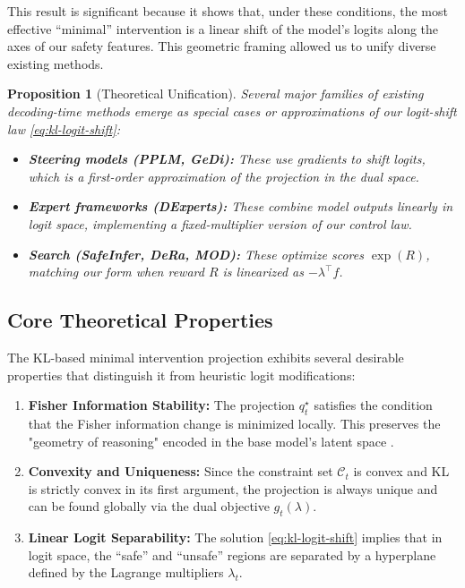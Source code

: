 \documentclass{article}
\theoremstyle{plain}
\newtheorem{proposition}[theorem]{Proposition}
\theoremstyle{definition}
\theoremstyle{remark}
\begin{document}
This result is significant because it shows that, under these conditions, the most effective ``minimal'' intervention is a linear shift of the model's logits along the axes of our safety features. This geometric framing allowed us to unify diverse existing methods.
\begin{proposition}[Theoretical Unification]
\label{prop:unified}
Several major families of existing decoding-time methods emerge as special cases or approximations of our logit-shift law \eqref{eq:kl-logit-shift}:
\begin{itemize}[leftmargin=1.5em, itemsep=0pt]
  \item \textbf{Steering models (PPLM, GeDi):} These use gradients to shift logits, which is a first-order approximation of the projection in the dual space.
  \item \textbf{Expert frameworks (DExperts):} These combine model outputs linearly in logit space, implementing a fixed-multiplier version of our control law.
  \item \textbf{Search (SafeInfer, DeRa, MOD):} These optimize scores $\exp(R)$, matching our form when reward $R$ is linearized as $-\lambda^\top f$.
\end{itemize}
\end{proposition}

\subsection{Core Theoretical Properties}
\label{sec:kl-properties}

The KL-based minimal intervention projection exhibits several desirable properties that distinguish it from heuristic logit modifications:
\begin{enumerate}[leftmargin=1.5em, itemsep=0pt]
  \item \textbf{Fisher Information Stability:} The projection $q_t^\star$ satisfies the condition that the Fisher information change is minimized locally. This preserves the "geometry of reasoning" encoded in the base model's latent space \citep{amari2016information}.
  \item \textbf{Convexity and Uniqueness:} Since the constraint set $\mathcal{C}_t$ is convex and KL is strictly convex in its first argument, the projection is always unique and can be found globally via the dual objective $g_t(\lambda)$.
  \item \textbf{Linear Logit Separability:} The solution \eqref{eq:kl-logit-shift} implies that in logit space, the ``safe'' and ``unsafe'' regions are separated by a hyperplane defined by the Lagrange multipliers $\lambda_t$.
\end{enumerate}
\end{document}
